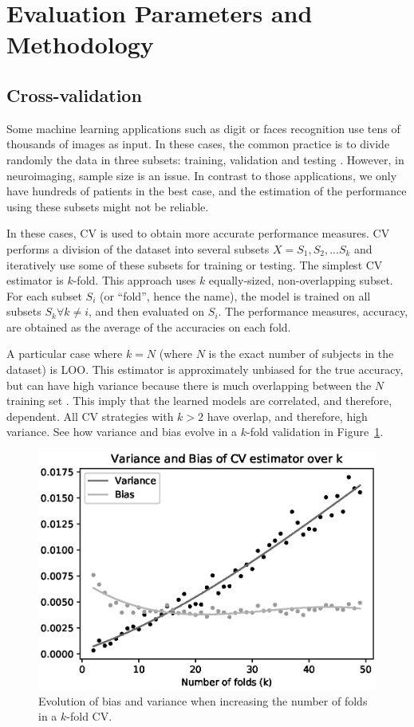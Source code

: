 \section{Evaluation Parameters and Methodology}\label{sec:validation}
\subsection{Cross-validation}
Some machine learning applications such as digit or faces recognition use tens of thousands of images as input. In these cases, the common practice is to divide randomly the data in three subsets: training, validation and testing \cite{Bradley1997}. However, in neuroimaging, sample size is an issue. In contrast to those applications, we only have hundreds of patients in the best case, and the estimation of the performance using these subsets might not be reliable. 
 
In these cases, \acf{CV} is used to obtain more accurate performance measures. \ac{CV} performs a division of the dataset into several subsets $X = {S_1, S_2, ... S_k}$ and iteratively use some of these subsets for training or testing. The simplest \ac{CV} estimator is $k$-fold. This approach uses $k$ equally-sized, non-overlapping subset. For each subset $S_i$ (or ``fold'', hence the name), the model is trained on all subsets $S_k \forall k \neq i$, and then evaluated on $S_i$. The performance measures, \eg accuracy, are obtained as the average of the accuracies on each fold. 

A particular case where $k=N$ (where $N$ is the exact number of subjects in the dataset) is \acf{LOO}. This estimator is approximately unbiased for the true accuracy, but can have high variance because there is much overlapping between the $N$ training set \cite{Hastie2009}. This imply that the learned models are correlated, and therefore, dependent. All \ac{CV} strategies with $k>2$ have overlap, and therefore, high variance. See how variance and bias evolve in a $k$-fold validation in Figure~\ref{fig:evolutionKFold}. 

\begin{figure}
\centering
\includegraphics[width=0.7\linewidth]{Graphics/ch3/evolutionKFold}
\caption[Evolution of bias and variance in CV.]{Evolution of bias and variance when increasing the number of folds in a $k$-fold \ac{CV}.}
\label{fig:evolutionKFold}
\end{figure}


